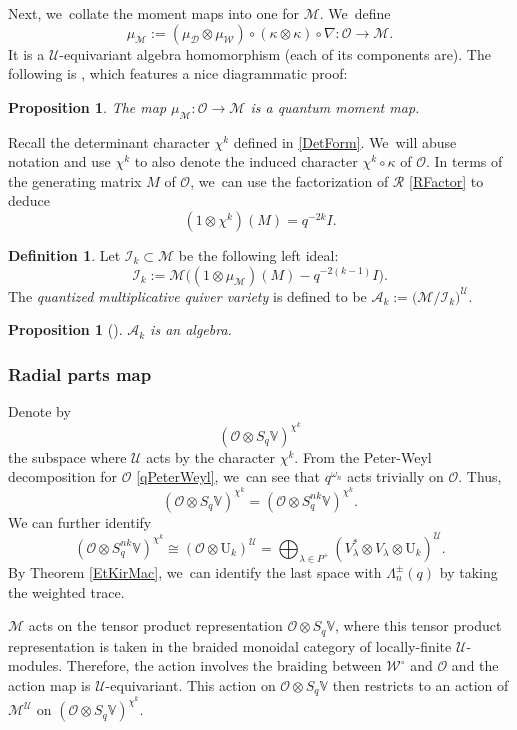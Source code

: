 \documentclass[11pt]{article}
\newcommand{\rU}{\mathrm{U}}
\newtheorem{prop}[thm]{Proposition}
\theoremstyle{definition}
\newtheorem{defn}[thm]{Definition}
\newcommand{\OO}{\mathcal{O}}
\newcommand{\UU}{\mathcal{U}}
\newcommand{\DD}{\mathcal{D}}
\newcommand{\WW}{\mathcal{W}}
\newcommand{\AAA}{\mathcal{A}}
\newcommand{\WWo}{\WW^\circ}
\newcommand{\MM}{\mathcal{M}}
\begin{document}
Next, we~collate the moment maps into one for $\MM$. We~define
\[
\mu_{\MM}:=(\mu_\DD\otimes\mu_\WW)\circ(\kappa\otimes\kappa)\circ\nabla:\OO\to\MM.
\]
It is a $\UU$-equivariant algebra homomorphism (each of its components are).
The following is \cite[Prop.\,3.10]{GanJorSaf}, which features a nice diagrammatic proof:

\begin{prop}\label{TensorMoment}
The map $\mu_{\MM}:\OO\to\MM$ is a quantum moment map.
\end{prop}

Recall the determinant character $\chi^k$ defined in \eqref{DetForm}. We~will abuse notation and use $\chi^k$ to also denote the induced character $\chi^k\circ\kappa$ of $\OO$.
In terms of the generating matrix $M$ of $\OO$, we~can use the factorization of $\mathcal{R}$ \eqref{RFactor} to deduce
\[
(1\otimes\chi^k)(M)=q^{-2k}I.
\]

\begin{defn}
Let $\mathcal{I}_k\subset\MM$ be the following left ideal:
\[
\mathcal{I}_k:=\MM\bigl((1\otimes\mu_{\MM})(M)-q^{-2(k-1)}I \bigr).
\]
The \textit{quantized multiplicative quiver variety} is defined to be $\AAA_k:=\big(\MM\big/\mathcal{I}_k\big)^\UU$.
\end{defn}

\begin{prop}[\cite{VarVassRoot,GanJorSaf}]\label{RedAlgProp}
$\AAA_k$ is an algebra.
\end{prop}

\subsubsection{Radial parts map}
Denote by
\[
\left(\OO\otimes S_q\mathbb{V} \right)^{\chi^k}
\]
the subspace where $\UU$ acts by the character $\chi^k$.
From the Peter-Weyl decomposition for $\OO$ \eqref{qPeterWeyl}, we~can see that $q^{\omega_n}$ acts trivially on $\OO$.
Thus,
\[
(\OO\otimes S_q\mathbb{V})^{\chi^k}=(\OO\otimes S_q^{nk}\mathbb{V})^{\chi^k}.
\]
We can further identify
\[
(\OO\otimes S_q^{nk}\mathbb{V})^{\chi^k}\cong (\OO\otimes \rU_k)^\UU=\bigoplus_{\lambda\in P^+}(V_\lambda^*\otimes V_\lambda\otimes \rU_k)^{\UU}.
\]
By Theorem \ref{EtKirMac}, we~can identify the last space with $\Lambda_n^\pm(q)$ by taking the weighted trace.

$\MM$ acts on the tensor product representation $\OO\otimes S_q\mathbb{V}$, where this tensor product representation is taken in the braided monoidal category of locally-finite $\UU$-modules.
Therefore, the action involves the braiding between $\WWo$ and $\OO$ and the action map is $\UU$\nobreakdash-equi\-variant.
This action on $\OO\otimes S_q\mathbb{V}$ then restricts to an action of $\MM^\UU$ on $(\OO\otimes S_q\mathbb{V})^{\chi^k}$.
\end{document}
